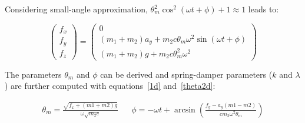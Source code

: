 \documentclass[\main/main.tex]{subfiles}
\begin{document}
Considering small-angle  approximation, $\theta_m^2 \cos^2(\omega t + \phi) + 1 \approx 1$ leads to:

\begin{equation}
  \begin{pmatrix}
  f_x \\
  f_y \\
  f_z
  \end{pmatrix}
  =
  \begin{pmatrix}
  0 \\
  (m_1 + m_2) a_y + m_2 c \theta_m \omega^2 \sin(\omega t + \phi) \\
  (m_1 + m_2) g + m_2 c \theta_m^2 \omega^2
  \end{pmatrix}
\end{equation}



The parameters $\theta_m$ and $\phi$ can be derived and spring-damper parameters ($k$ and $\lambda$) are further computed with equations~\eqref{1d} and~\eqref{theta2d}:

\begin{align}
  \theta_m = \frac{\sqrt{f_x + (m1 + m2) g}}{ \omega \sqrt{m_2 c}} &&
  \phi = - \omega t + \arcsin \left( \frac{f_y - a_y (m1 - m2)}{c m_2 \omega^2 \theta_m} \right)
\end{align}
\end{document}
